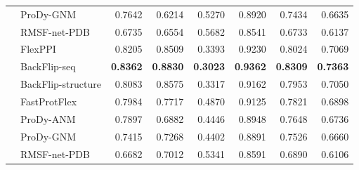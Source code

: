 \begin{table}[htbp]
{\begin{tabular}{llrrrrrr}
    & ProDy-GNM
      & 0.7642 & 0.6214 & 0.5270 & 0.8920 & 0.7434 & 0.6635 \\
    & RMSF-net-PDB
      & 0.6735 & 0.6554 & 0.5682 & 0.8541 & 0.6733 & 0.6137 \\
    \midrule
    \rowcolor{gray!12} \cellcolor{white}\multirow{7}{*}{ATLAS 单链} & FlexPPI
      & 0.8205 & 0.8509 & 0.3393 & 0.9230 & 0.8024 & 0.7069 \\
    & BackFlip-seq
      & \textbf{0.8362} & \textbf{0.8830} & \textbf{0.3023}
      & \textbf{0.9362} & \textbf{0.8309} & \textbf{0.7363} \\
    & BackFlip-structure
      & 0.8083 & 0.8575 & 0.3317 & 0.9162 & 0.7953 & 0.7050 \\
    & FastProtFlex
      & 0.7984 & 0.7717 & 0.4870 & 0.9125 & 0.7821 & 0.6898 \\
    & ProDy-ANM
      & 0.7897 & 0.6882 & 0.4446 & 0.8948 & 0.7648 & 0.6736 \\
    & ProDy-GNM
      & 0.7415 & 0.7268 & 0.4402 & 0.8891 & 0.7526 & 0.6660 \\
    & RMSF-net-PDB
      & 0.6682 & 0.7012 & 0.5341 & 0.8591 & 0.6890 & 0.6106 \\
    \bottomrule
  \end{tabular}%
  }
\end{table}
